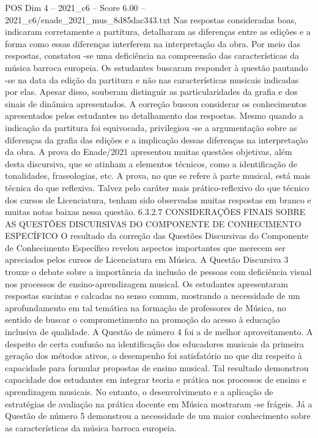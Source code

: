 \begin{textsample}{POS Dim 4 – 2021\_c6 – Score 6.00 – 2021\_c6/enade\_2021\_mus\_8d85dac343.txt}
Nas respostas consideradas boas, indicaram corretamente a partitura, detalharam as diferenças entre as edições e a forma como essas diferenças interferem na interpretação da obra.
Por meio das respostas, constatou -se uma deficiência na compreensão das características da música barroca europeia.
Os estudantes buscaram responder à questão pautando -se na data da edição da partitura e não nas características musicais indicadas por elas.
Apesar disso, souberam distinguir as particularidades da grafia e dos sinais de dinâmica apresentados.
A correção buscou considerar os conhecimentos apresentados pelos estudantes no detalhamento das respostas.
Mesmo quando a indicação da partitura foi equivocada, privilegiou -se a argumentação sobre as diferenças da grafia das edições e a implicação dessas diferenças na interpretação da obra.
A prova do Enade/2021 apresentou muitas questões objetivas, além desta discursiva, que se atinham a elementos técnicos, como a identificação de tonalidades, fraseologias, etc.
A prova, no que se refere à parte musical, está mais técnica do que reflexiva.
Talvez pelo caráter mais prático-reflexivo do que técnico dos cursos de Licenciatura, tenham sido observadas muitas respostas em branco e muitas notas baixas nessa questão. 6.3.2.7 CONSIDERAÇÕES FINAIS SOBRE AS QUESTÕES DISCURSIVAS DO COMPONENTE DE CONHECIMENTO ESPECÍFICO O resultado da correção das Questões Discursivas do Componente de Conhecimento Específico revelou aspectos importantes que merecem ser apreciados pelos cursos de Licenciatura em Música.
A Questão Discursiva 3 trouxe o debate sobre a importância da inclusão de pessoas com deficiência visual nos processos de ensino-aprendizagem musical.
Os estudantes apresentaram respostas sucintas e calcadas no senso comum, mostrando a necessidade de um aprofundamento em tal temática na formação de professores de Música, no sentido de buscar o comprometimento na promoção do acesso à educação inclusiva de qualidade.
A Questão de número 4 foi a de melhor aproveitamento.
A despeito de certa confusão na identificação dos educadores musicais da primeira geração dos métodos ativos, o desempenho foi satisfatório no que diz respeito à capacidade para formular propostas de ensino musical.
Tal resultado demonstrou capacidade dos estudantes em integrar teoria e prática nos processos de ensino e aprendizagem musicais.
No entanto, o desenvolvimento e a aplicação de estratégias de avaliação na prática docente em Música mostraram -se frágeis.
Já a Questão de número 5 demonstrou a necessidade de um maior conhecimento sobre as características da música barroca europeia.

\end{textsample}
